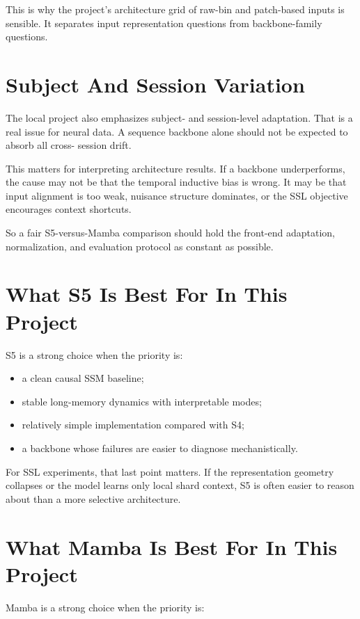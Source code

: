 This is why the project's architecture grid of raw-bin and patch-based inputs is sensible.
It separates input representation questions from backbone-family questions.

\section{Subject And Session Variation}

The local project also emphasizes subject- and session-level adaptation. That is a real
issue for neural data. A sequence backbone alone should not be expected to absorb all cross-
session drift.

This matters for interpreting architecture results. If a backbone underperforms, the cause
may not be that the temporal inductive bias is wrong. It may be that input alignment is too
weak, nuisance structure dominates, or the SSL objective encourages context shortcuts.

So a fair S5-versus-Mamba comparison should hold the front-end adaptation, normalization,
and evaluation protocol as constant as possible.

\section{What S5 Is Best For In This Project}

S5 is a strong choice when the priority is:

\begin{itemize}
  \item a clean causal SSM baseline;
  \item stable long-memory dynamics with interpretable modes;
  \item relatively simple implementation compared with S4;
  \item a backbone whose failures are easier to diagnose mechanistically.
\end{itemize}

For SSL experiments, that last point matters. If the representation geometry collapses or
the model learns only local shard context, S5 is often easier to reason about than a more
selective architecture.

\section{What Mamba Is Best For In This Project}

Mamba is a strong choice when the priority is:

